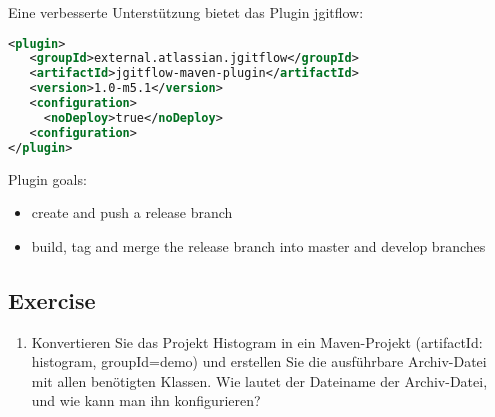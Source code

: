 Eine verbesserte Unterstützung bietet das Plugin jgitflow:
\begin{lstlisting}[language=xml,morekeywords={plugin,groupId,artifactId,configuration,noDeploy}]
<plugin>
   <groupId>external.atlassian.jgitflow</groupId>
   <artifactId>jgitflow-maven-plugin</artifactId>
   <version>1.0-m5.1</version>
   <configuration>
     <noDeploy>true</noDeploy>
   <configuration>
</plugin>
\end{lstlisting}
Plugin goals:
\begin{itemize}
\item {} create and push a release branch
\item {} build, tag and merge the release branch
into master and develop branches
\end{itemize}
\newslide
\subsection{Exercise}
\begin{enumerate}
\item Konvertieren Sie das Projekt Histogram in ein Maven-Projekt
(artifactId: histogram, groupId=demo) und
erstellen Sie die ausführbare Archiv-Datei mit allen benötigten Klassen.
Wie lautet der Dateiname der Archiv-Datei, und wie kann man ihn
konfigurieren?

\end{enumerate}
%
